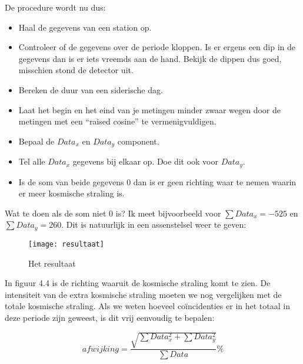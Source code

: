 De procedure wordt nu dus:
\begin{itemize}
\item Haal de gegevens van een station op.
\item Controleer of de gegevens over de periode kloppen. Is er ergens een
dip in de gegevens dan is er iets vreemds aan de hand. Bekijk de dippen
dus goed, misschien stond de detector uit.
\item Bereken de duur van een siderische dag.
\item Laat het begin en het eind van je metingen minder zwaar wegen door
de metingen met een ``raised cosine'' te vermenigvuldigen.
\item Bepaal de $Data_{x}$ en $Data_{y}$ component.
\item Tel alle $Data_{x}$ gegevens bij elkaar op. Doe dit ook voor $Data_{y}$.
\item Is de som van beide gegevens 0 dan is er geen richting waar te nemen
waarin er meer kosmische straling is.
\end{itemize}
Wat te doen als de som niet 0 is? Ik meet bijvoorbeeld voor $\sum Data_{x}=-525$
en $\sum Data_{y}=260$. Dit is natuurlijk in een assenstelsel weer
te geven:

\begin{figure}[h]
    \centering
    \texttt{[image: resultaat]}
    \caption{Het resultaat}
\end{figure}


In figuur 4.4 is de richting waaruit de kosmische straling komt te
zien. De intensiteit van de extra kosmische straling moeten we nog
vergelijken met de totale kosmische straling. Als we weten hoeveel
coïncidenties er in het totaal in deze periode zijn geweest, is dit
vrij eenvoudig te bepalen:

\begin{equation}
afwijking=\frac{\sqrt{\sum Data_{x}^{2}+\sum Data_{y}^{2}}}{\sum Data}\%
\end{equation}


